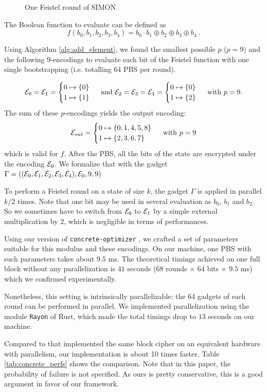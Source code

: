 \begin{figure}
    \centering
    
    \caption{One Feistel round of SIMON. }     
    \label{fig:simon_cipher}
\end{figure}


The Boolean function to evaluate can be defined as $$f(b_0, b_1, b_2, b_3, b_4) = b_0 \cdot b_1 \oplus b_2 \oplus b_3 \oplus b_4~.$$


Using Algorithm \ref{alg:add_element}, we found the smallest possible $p$ ($p = 9$) and the following $9$-encodings to evaluate each bit of the Feistel function with one single bootstrapping (i.e. totalling 64 \gls{PBS} per round). 


\[\mathcal{E}_0 = \mathcal{E}_1 = \begin{cases} 0 \mapsto \{0\} \\ 1 \mapsto \{1\} \end{cases} \text{ and } \mathcal{E}_2 = \mathcal{E}_3 = \mathcal{E}_4 = \begin{cases} 0 \mapsto \{0\} \\ 1 \mapsto \{2\} \end{cases} \text{ with } p = 9.\] The sum of these $p$-encodings yields the output encoding: \[\mathcal{E}_{out} = \begin{cases} 0 \mapsto \{0, 1, 4, 5, 8\} \\ 1 \mapsto \{2, 3, 6, 7\} \end{cases} \text{ with } p=9\] which is valid for $f$. After the \gls{PBS}, all the bits of the state are encrypted under the encoding $\mathcal{E}_0$. We formalize that with the gadget $\Gamma = \left ((\mathcal{E}_0, \mathcal{E}_1, \mathcal{E}_2, \mathcal{E}_3, \mathcal{E}_4), \mathcal{E}_0, 9, 9\right )$


To perform a Feistel round on a state of size $k$, the gadget $\Gamma$ is applied in parallel $k / 2$ times. Note that one bit may be used in several evaluation as $b_0$, $b_1$ and $b_2$. So we sometimes have to switch from $\mathcal{E}_0$ to $\mathcal{E}_1$ by a simple external multiplication by $2$, which is negligible in terms of performances.


Using our version of \texttt{concrete-optimizer} \cite{concrete-optimizer}, we crafted a set of parameters suitable for this modulus and these encodings. 
On our machine, one \gls{PBS} with such parameters takes about $9.5$ ms. The theoretical timings achieved on one full block without any parallelization is $41$ seconds ($68$ rounds $\times$ $64$ bits $\times$ $9.5$ ms)  which we confirmed experimentally.


Nonetheless, this setting is intrinsically parallelizable: the 64 gadgets of each round can be performed in parallel. We implemented parallelization using the module \texttt{Rayon} of Rust, which made the total timings drop to $13$ seconds on our machine. 

Compared to \cite{DBLP:conf/fps/BendoukhaSSQS22} that implemented the same block cipher on an equivalent hardware with parallelism, our implementation is about 10 times faster. Table \ref{tab:concrete_perfs} shows the comparison. Note that in this paper, the probability of failure is not specified. As ours is pretty conservative, this is a good argument in favor of our framework.


